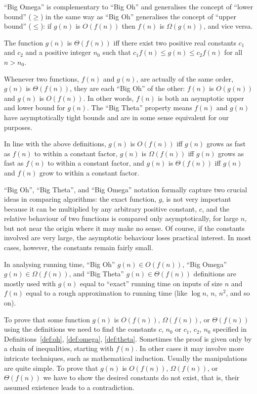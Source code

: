 ``Big Omega'' is complementary to ``Big Oh'' and generalises the
concept of ``lower bound'' (\(\ge\)) in the same way as ``Big Oh''
generalises the concept of ``upper bound'' (\(\le\)): if
\(g(n)\) is \(O(f(n))\) then \(f(n)\) is \(\Omega(g(n))\), and vice versa. 

\begin{Definition} 
\label{def:theta}
The function $g(n)$ is $\Theta(f(n))$ iff 
there exist two positive real constants $c_1$ and $c_2$ and a 
positive integer $n_{0}$  
such that $c_1f(n) \le g(n) \le c_2 f(n)$ for all $n>n_{0}$.
\end{Definition}

Whenever two functions, \(f(n)\) and \(g(n)\), are actually of the same
order, \(g(n)\) is \(\Theta(f(n))\), they are each ``Big Oh'' of the
other: $f(n)$ is $O(g(n))$ and $g(n)$ is  $O(f(n))$. In other words,
\(f(n)\) is both an asymptotic upper and lower bound for \(g(n)\). The
``Big Theta'' property means \(f(n)\) and \(g(n)\) have asymptotically
tight bounds and are in some sense equivalent for our purposes.

In line with the above definitions,
\(g(n)\) is \(O(f(n))\) iff \(g(n)\) grows  as fast as \(f(n)\) to within a constant factor, \(g(n)\) is
\(\Omega(f(n))\) iff \(g(n)\) grows  as fast as \(f(n)\) to within a constant factor, and
\(g(n)\) is \(\Theta(f(n))\) iff \(g(n)\) and \(f(n)\) grow
 to within a constant factor.


``Big Oh'', ``Big Theta'', and ``Big Omega'' notation formally capture 
two crucial ideas in comparing algorithms:
the exact function, $g$, is not very
important because it can be multiplied by any
arbitrary positive constant, $c$, and
the relative behaviour of two functions
is compared only asymptotically, for large $n$, but not near the
origin where it may make no sense.
Of course, if the constants involved are very large, 
the asymptotic behaviour loses practical interest. In most
cases, however, the constants remain fairly small. 

In analysing running time,
``Big Oh'' $g(n) \in O(f(n))$, ``Big Omega'' $g(n) \in \Omega(f(n))$,
and ``Big Theta'' $g(n) \in \Theta(f(n))$  
definitions are mostly used with $g(n)$ equal to 
``exact'' running time on inputs of size $n$ and 
$f(n)$ equal to a rough approximation to
running time (like \(\log n\), \(n\), \(n^2\), and so on).
 
To prove that some
function \(g(n)\) is \(O(f(n))\), \(\Omega(f(n))\), or 
\(\Theta(f(n))\) using the definitions we need to find the constants \(c\), \(n_0\) or \(c_1\), \(c_2\), \(n_0\) specified in 
Definitions~\ref{def:oh}, \ref{def:omega}, \ref{def:theta}. 
Sometimes the proof is given only by a chain of inequalities,
starting with \(f(n)\). In other cases it
may involve more intricate techniques, such as mathematical
induction. Usually the manipulations
are quite simple. To prove that \(g(n)\) is  
\(O(f(n))\), \(\Omega(f(n))\), or \(\Theta(f(n))\) we have 
to show the desired constants do not exist, that is,
their assumed existence leads to a contradiction.

